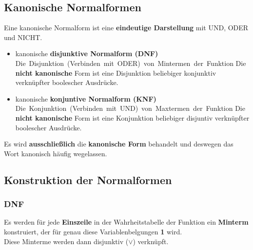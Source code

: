 \documentclass[12pt]{article}
\begin{document}
\subsection{Kanonische Normalformen}
Eine kanonische Normalform ist eine \textbf{eindeutige Darstellung} mit UND, ODER und NICHT. \\
\begin{itemize}
    \item kanonische \textbf{disjunktive Normalform (DNF)}
        \subitem \hbox{Die Disjunktion (Verbinden mit ODER) von Mintermen der Funktion}
        \subitem \vbox{Die \textbf{nicht kanonische} Form ist eine Disjunktion beliebiger konjunktiv \\ verknüpfter boolescher Ausdrücke.}
    \item kanonische \textbf{konjuntive Normalform (KNF)}
        \subitem \hbox{Die Konjunktion (Verbinden mit UND) von Maxtermen der Funktion}
        \subitem \vbox{Die \textbf{nicht kanonische} Form ist eine Konjunktion beliebiger disjuntiv verknüpfter boolescher Ausdrücke.}
\end{itemize}
Es wird \textbf{ausschließlich} die \textbf{kanonische Form} behandelt und deswegen das Wort kanonisch häufig wegelassen.
\subsection{Konstruktion der Normalformen}
\subsubsection{DNF}
Es werden für jede \textbf{Einszeile} in der Wahrheitstabelle der Funktion ein \textbf{Minterm} konstruiert, der für genau diese Variablenbelgungen \textbf{1} wird. \\
Diese Minterme werden dann disjunktiv ($\lor$) verknüpft.
\end{document}
